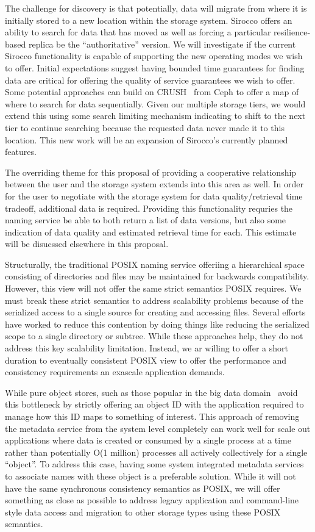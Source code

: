 The challenge for discovery is that potentially, data will migrate from where
it is initially stored to a new location within the storage system. Sirocco
offers an ability to search for data that has moved as well as forcing a
particular resilience-based replica be the ``authoritative'' version. We will
investigate if the current Sirocco functionality is capable of supporting the
new operating modes we wish to offer. Initial expectations suggest having
bounded time guarantees for finding data are critical for offering the quality
of service guarantees we wish to offer. Some potential approaches can build on
CRUSH~\cite{ceph} from Ceph to offer a map of where to search for data
sequentially. Given our multiple storage tiers, we would extend this using some
search limiting mechanism indicating to shift to the next tier to continue
searching because the requested data never made it to this location. This new
work will be an expansion of Sirocco's currently planned features.

The overriding theme for this proposal of providing a cooperative relationship
between the user and the storage system extends into this area as well. In
order for the user to negotiate with the storage system for data
quality/retrieval time tradeoff, additional data is required. Providing this
functionality requries the naming service be able to both return a list of data
versions, but also some indication of data quality and estimated retrieval time
for each. This estimate will be disucssed elsewhere in this proposal.

Structurally, the traditional POSIX naming service offeriing a hierarchical
space consisting of directories and files may be maintained for backwards
compatibility. However, this view will not offer the same strict semantics
POSIX requires. We must break these strict semantics to address scalability
problems because of the serialized access to a single source for creating and
accessing files.  Several efforts~\cite{giga+,pvfs,others} have worked to
reduce this contention by doing things like reducing the serialized scope to a
single directory or subtree. While these approaches help, they do not address
this key scalability limitation. Instead, we ar willing to offer a short
duration to eventually consistent POSIX view to offer the performance and
consistency requirements an exascale application demands.

While pure object stores, such as those popular in the big data
domain~\cite{memcached,others} avoid this bottleneck by strictly offering an
object ID with the application required to manage how this ID maps to something
of interest. This approach of removing the metadata service from the system
level completely can work well for scale out applications where data is created
or consumed by a single process at a time rather than potentially O(1 million)
processes all actively collectively for a single ``object''. To address this
case, having some system integrated metadata services to associate names with
these object is a preferable solution. While it will not have the same
synchronous consistency semantics as POSIX, we will offer something as close as
possible to address legacy application and command-line style data access and
migration to other storage types using these POSIX semantics.

